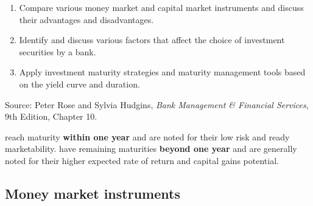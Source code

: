 
\begin{lrkeybox}
\begin{enumerate}[label=\textbf{\alph*.}]
\item Compare various money market and capital market instruments and discuss their advantages and disadvantages.
\item Identify and discuss various factors that affect the choice of investment securities by a bank.
\item Apply investment maturity strategies and maturity management tools based on the yield curve and duration.
\end{enumerate}
{\footnotesize\color{FRMGrey}Source: Peter Rose and Sylvia Hudgins, \textit{Bank Management \& Financial Services}, 9th Edition, Chapter 10.}
\end{lrkeybox}


\begin{lrdefbox}
 reach maturity \textbf{within one year} and are noted for their low risk and ready marketability.  have remaining maturities \textbf{beyond one year} and are generally noted for their higher expected rate of return and capital gains potential.
\end{lrdefbox}

\subsection{Money market instruments}

